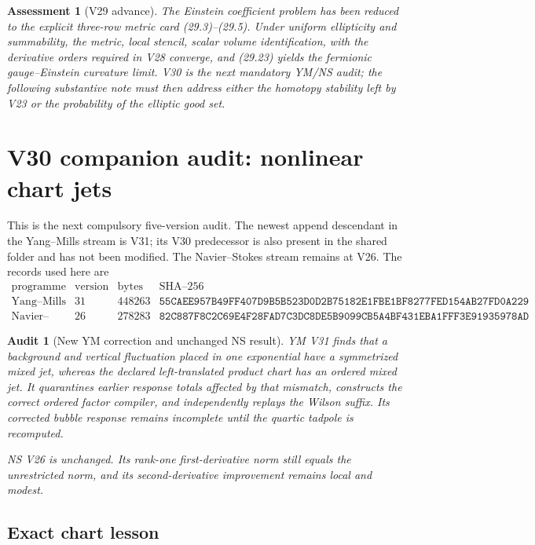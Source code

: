 \documentclass[11pt]{article}
\newtheorem{assessment}[theorem]{Assessment}
\newtheorem{audit}[theorem]{Audit}
\begin{document}
\begin{assessment}[V29 advance]
\label{ass:v11v29}
The Einstein coefficient problem has been reduced to the explicit
three-row metric card (29.3)--(29.5).  Under uniform ellipticity and
summability, the metric, local stencil, scalar volume identification,
with the derivative orders required in V28 converge, and (29.23) yields the
fermionic gauge--Einstein curvature limit.  V30 is the next mandatory
YM/NS audit; the following substantive note must then address either
the homotopy stability left by V23 or the probability of the elliptic
good set.
\end{assessment}
\section{V30 companion audit: nonlinear chart jets}
\label{sec:v11v30}

This is the next compulsory five-version audit.  The newest append
descendant in the Yang--Mills stream is V31; its V30 predecessor is also
present in the shared folder and has not been modified.  The
Navier--Stokes stream remains at V26.  The records used here are
\[
\begin{array}{c|c|r|l}
 \text{programme}&\text{version}&\text{bytes}&\text{SHA--256}\\ \hline
 \text{Yang--Mills}&31&448263&
 \texttt{55CAEE957B49FF407D9B5B523D0D2B75182E1FBE1BF8277FED154AB27FD0A229}\\
 \text{Navier--Stokes}&26&278283&
 \texttt{82C887F8C2C69E4F28FAD7C3DC8DE5B9099CB5A4BF431EBA1FFF3E91935978AD}
\end{array}
\tag{30.1}
\]

\begin{audit}[New YM correction and unchanged NS result]
\label{audit:v11v30-companions}
YM V31 finds that a background and vertical fluctuation placed in one
exponential have a symmetrized mixed jet, whereas the declared
left-translated product chart has an ordered mixed jet.  It quarantines
earlier response totals affected by that mismatch, constructs the
correct ordered factor compiler, and independently replays the Wilson
suffix.  Its corrected bubble response remains incomplete until the
quartic tadpole is recomputed.

NS V26 is unchanged.  Its rank-one first-derivative norm still equals
the unrestricted norm, and its second-derivative improvement remains
local and modest.
\end{audit}

\subsection{Exact chart lesson}
\end{document}
